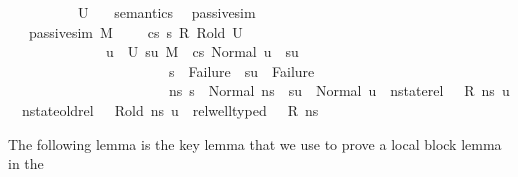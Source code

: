 \begin{isabellebody}
\ \ \ \ \ \ \ \ \ \ U{}\ {\isasymnoteq}\ {\isacharbraceleft}{\kern0pt}{\isacharbraceright}{\kern0pt}{\isacharparenright}{\kern0pt}{\isachardoublequoteclose}\isanewline
\isanewline
\isanewline
{}\isamarkupfalse%
\ semantics\ \isanewline
\isanewline
{}\isamarkupfalse%
\ passive{\isacharunderscore}{\kern0pt}sim\ \isanewline
\ \ \ {\isachardoublequoteopen}passive{\isacharunderscore}{\kern0pt}sim\ M\ {\isasymLambda}\ {\isasymLambda}{\isacharprime}{\kern0pt}\ {\isasymGamma}\ {\isasymOmega}\ cs\ s{\isacharprime}{\kern0pt}\ R\ R{\isacharunderscore}{\kern0pt}old\ U\ {\isasymequiv}\ \isanewline
\ \ \ \ \ \ \ \ \ \ \ \ \ \ {\isacharparenleft}{\kern0pt}{\isasymforall}u\ {\isasymin}\ U{\isachardot}{\kern0pt}\ {\isasymexists}su{\isachardot}{\kern0pt}\ {\isacharparenleft}{\kern0pt}M{\isacharcomma}{\kern0pt}{\isasymLambda}{\isacharprime}{\kern0pt}{\isacharcomma}{\kern0pt}{\isasymGamma}{\isacharcomma}{\kern0pt}{\isasymOmega}\ {\isasymturnstile}\ {\isasymlangle}cs{\isacharcomma}{\kern0pt}\ Normal\ u{\isasymrangle}\ {\isacharbrackleft}{\kern0pt}{\isasymrightarrow}{\isacharbrackright}{\kern0pt}\ su{\isacharparenright}{\kern0pt}\ {\isasymand}\ \isanewline
\ \ \ \ \ \ \ \ \ \ \ \ \ \ \ \ \ \ \ \ \ \ \ {\isacharparenleft}{\kern0pt}s{\isacharprime}{\kern0pt}\ {\isacharequal}{\kern0pt}\ Failure\ {\isasymlongrightarrow}\ su\ {\isacharequal}{\kern0pt}\ Failure{\isacharparenright}{\kern0pt}\ {\isasymand}\isanewline
\ \ \ \ \ \ \ \ \ \ \ \ \ \ \ \ \ \ \ \ \ \ \ {\isacharparenleft}{\kern0pt}{\isasymforall}ns{\isacharprime}{\kern0pt}{\isachardot}{\kern0pt}\ s{\isacharprime}{\kern0pt}\ {\isacharequal}{\kern0pt}\ Normal\ ns{\isacharprime}{\kern0pt}\ {\isasymlongrightarrow}\ {\isacharparenleft}{\kern0pt}su\ {\isacharequal}{\kern0pt}\ Normal\ u\ {\isasymand}\ nstate{\isacharunderscore}{\kern0pt}rel\ {\isasymLambda}\ {\isasymLambda}{\isacharprime}{\kern0pt}\ R\ ns{\isacharprime}{\kern0pt}\ u\ {\isasymand}\ nstate{\isacharunderscore}{\kern0pt}old{\isacharunderscore}{\kern0pt}rel\ {\isasymLambda}\ {\isasymLambda}{\isacharprime}{\kern0pt}\ R{\isacharunderscore}{\kern0pt}old\ ns{\isacharprime}{\kern0pt}\ u\ {\isasymand}\ rel{\isacharunderscore}{\kern0pt}well{\isacharunderscore}{\kern0pt}typed\ {\isasymLambda}\ {\isasymOmega}\ R\ ns{\isacharprime}{\kern0pt}{\isacharparenright}{\kern0pt}{\isacharparenright}{\kern0pt}{\isacharparenright}{\kern0pt}{\isachardoublequoteclose}%
\begin{isamarkuptext}%
The following lemma is the key lemma that we use to prove a local block lemma in the 

\end{isamarkuptext}
\end{isabellebody}
